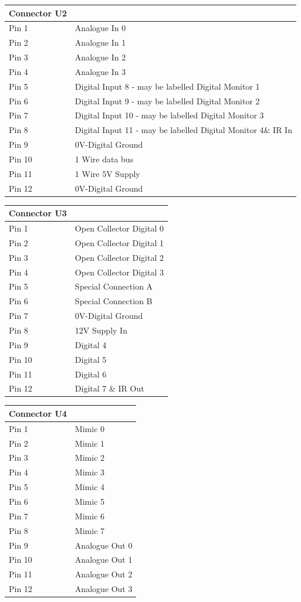 \begin{tabular}{l|p{5cm}}
Connector U2&\\
\hline
Pin 1&Analogue In 0\\
Pin 2&Analogue In 1\\
Pin 3&Analogue In 2\\
Pin 4&Analogue In 3\\
Pin 5&Digital Input 8 - may be labelled Digital Monitor 1\\
Pin 6&Digital Input 9 - may be labelled Digital Monitor 2\\
Pin 7&Digital Input 10 - may be labelled Digital Monitor 3\\
Pin 8&Digital Input 11 - may be labelled Digital Monitor 4\& IR In\\
Pin 9&0V-Digital Ground\\
Pin 10&1 Wire data bus\\
Pin 11&1 Wire 5V Supply\\
Pin 12&0V-Digital Ground\\
\end{tabular}

\begin{tabular}{l|p{5cm}}
Connector U3&\\
\hline
Pin 1&Open Collector Digital 0\\
Pin 2&Open Collector Digital 1\\
Pin 3&Open Collector Digital 2\\
Pin 4&Open Collector Digital 3\\
Pin 5&Special Connection A\\
Pin 6&Special Connection B\\
Pin 7&0V-Digital Ground\\
Pin 8&12V Supply In\\
Pin 9&Digital 4\\
Pin 10&Digital 5\\
Pin 11&Digital 6\\
Pin 12&Digital 7 \& IR Out\\
\end{tabular}

\begin{tabular}{l|p{5cm}}
Connector U4&\\
\hline
Pin 1&Mimic 0\\
Pin 2&Mimic 1\\
Pin 3&Mimic 2\\
Pin 4&Mimic 3\\
Pin 5&Mimic 4\\
Pin 6&Mimic 5\\
Pin 7&Mimic 6\\
Pin 8&Mimic 7\\
Pin 9&Analogue Out 0\\
Pin 10&Analogue Out 1\\
Pin 11&Analogue Out 2\\
Pin 12&Analogue Out 3\\
\end{tabular}

